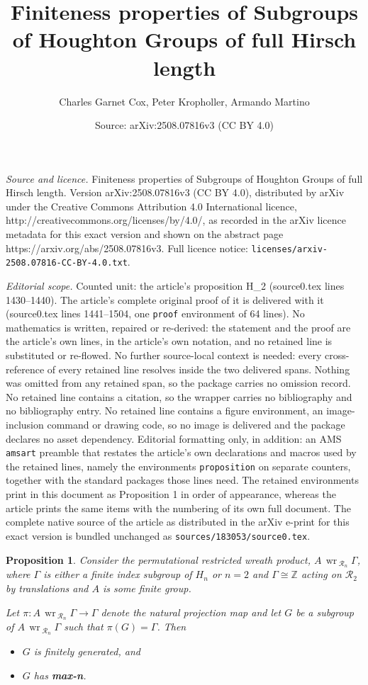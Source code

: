 \documentclass[10pt,a4paper]{amsart}
\title{Finiteness properties of Subgroups of Houghton Groups of full Hirsch length}
\author{Charles Garnet Cox, Peter Kropholler, Armando Martino}
\date{Source: arXiv:2508.07816v3 (CC BY 4.0)}
\newtheorem{proposition}{Proposition}
\newcommand{\Ra}{\mathcal{R}}
\newcommand{\Z}{\mathbb Z}
\renewcommand{\wr}{\operatorname{\,wr\,}}
\begin{document}
\maketitle

\noindent\emph{Source and licence.} Finiteness properties of Subgroups of Houghton Groups of full Hirsch length. Version arXiv:2508.07816v3 (CC BY 4.0), distributed by arXiv under the Creative Commons Attribution 4.0 International licence, http://creativecommons.org/licenses/by/4.0/, as recorded in the arXiv licence metadata for this exact version and shown on the abstract page https://arxiv.org/abs/2508.07816v3. Full licence notice: \texttt{licenses/arxiv-2508.07816-CC-BY-4.0.txt}.\par\smallskip

\noindent\textit{Editorial scope.} Counted unit: the article's proposition H\_2 (source0.tex lines 1430--1440). The article's complete original proof of it is delivered with it (source0.tex lines 1441--1504, one \texttt{proof} environment of 64 lines). No mathematics is written, repaired or re-derived: the statement and the proof are the article's own lines, in the article's own notation, and no retained line is substituted or re-flowed.  No further source-local context is needed: every cross-reference of every retained line resolves inside the two delivered spans.  Nothing was omitted from any retained span, so the package carries no omission record.  No retained line contains a citation, so the wrapper carries no bibliography and no bibliography entry.  No retained line contains a figure environment, an image-inclusion command or drawing code, so no image is delivered and the package declares no asset dependency.  Editorial formatting only, in addition: an AMS \texttt{amsart} preamble that restates the article's own declarations and macros used by the retained lines, namely the environments \texttt{proposition} on separate counters, together with the standard packages those lines need.  The retained environments print in this document as Proposition 1 in order of appearance, whereas the article prints the same items with the numbering of its own full document.  The complete native source of the article as distributed in the arXiv e-print for this exact version is bundled unchanged as \texttt{sources/183053/source0.tex}.
\begin{proposition}
	\label{normal subgroups of wreaths in H_2}
	Consider the permutational restricted wreath product, $A \wr_{\Ra_n} \Gamma$, where $\Gamma$ is either a finite index subgroup of $H_n$ or $n=2$ and $\Gamma \cong \Z$ acting on $\Ra_2$ by translations and $A$ is some finite group.
	
	
	Let $\pi: A \wr_{\Ra_n} \Gamma \to \Gamma$ denote the natural projection map and let $G$ be a subgroup of $A \wr_{\Ra_n} \Gamma$ such that $\pi(G) = \Gamma$. Then 
	\begin{itemize}
		\item $G$ is finitely generated, and
		\item $G$ has \textbf{max-n}. 
	\end{itemize}
\end{proposition}
\end{document}
